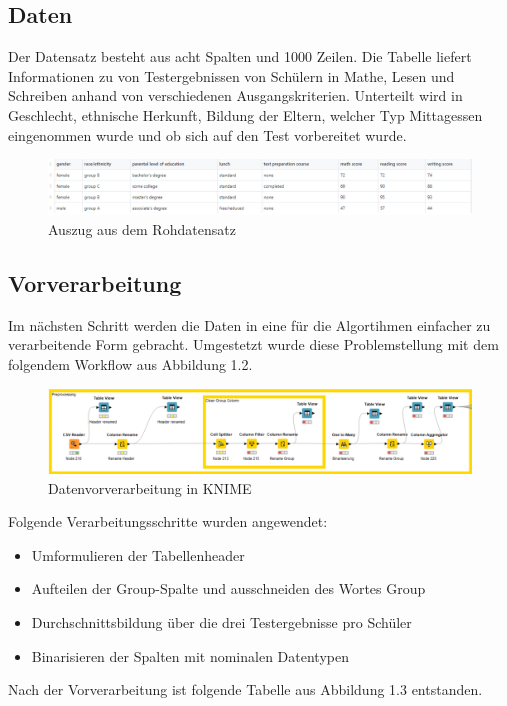 \documentclass[12pt,					%
							 oneside,			%
							 a4paper,			%
							 halfparskip,		%
							 liststotoc,			%
							 bibtotoc,			%
							 fleqn,				%
							 pointlessnumbers]	%
							 {scrreprt}
\begin{document}
	\subsection{Daten}
	Der Datensatz besteht aus acht Spalten und 1000 Zeilen.  Die Tabelle liefert Informationen zu von Testergebnissen von Schülern in Mathe, Lesen und Schreiben anhand von verschiedenen Ausgangskriterien. Unterteilt wird in Geschlecht, ethnische Herkunft, Bildung der Eltern, welcher Typ Mittagessen eingenommen wurde und ob sich auf den Test vorbereitet wurde. 
	\begin{figure}[!h]
		\includegraphics[scale=0.65]{pictures/roh.png}
		\caption{Auszug aus dem Rohdatensatz}
	\end{figure}
	\subsection{Vorverarbeitung}
	Im nächsten Schritt werden die Daten in eine für die Algortihmen einfacher zu verarbeitende Form gebracht. Umgestetzt wurde diese Problemstellung mit dem folgendem Workflow aus Abbildung 1.2.
	
	\begin{figure}[!h]
		\includegraphics[scale=0.50]{pictures/preprocessing.png}
		\caption{Datenvorverarbeitung in KNIME}
	\end{figure}
	
	Folgende Verarbeitungsschritte wurden angewendet:
	\begin{itemize}
	\item Umformulieren der Tabellenheader
	\item Aufteilen der Group-Spalte und ausschneiden des Wortes Group
	\item Durchschnittsbildung über die drei Testergebnisse pro Schüler
	\item Binarisieren der Spalten mit nominalen Datentypen
	\end{itemize}
	\newpage
	Nach der Vorverarbeitung ist folgende Tabelle aus Abbildung 1.3 entstanden.
	
\end{document}
